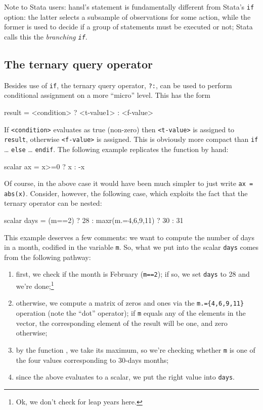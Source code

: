 Note to Stata users: hansl's  statement is fundamentally
different from Stata's \texttt{if} option: the latter selects a
subsample of observations for some action, while the former is used to
decide if a group of statements must be executed or not; Stata calls
this the \emph{branching \texttt{if}}.

\subsection{The ternary query operator}

Besides use of \texttt{if}, the ternary query operator, \texttt{?:},
can be used to perform conditional assignment on a more ``micro''
level. This has the form
\begin{code}
result = <condition> ? <t-value1> : <f-value>
\end{code}
If \texttt{<condition>} evaluates as true (non-zero) then
\texttt{<t-value>} is assigned to \texttt{result}, otherwise
\texttt{<f-value>} is assigned. This is obviously more compact than
\texttt{if} \dots{} \texttt{else} \dots{} \texttt{endif}. The
following example replicates the  function by hand:
\begin{code}
scalar ax = x>=0 ? x : -x
\end{code}
Of course, in the above case it would have been much simpler to just
write \texttt{ax = abs(x)}. Consider, however, the following case,
which exploits the fact that the ternary operator can be nested:
\begin{code}
scalar days = (m==2) ? 28 : maxr(m.={4,6,9,11}) ? 30 : 31
\end{code}
This example deserves a few comments: we want to compute the number of
days in a month, codified in the variable \texttt{m}. So, what we put into
the scalar \texttt{days} comes from the following pathway:
\begin{enumerate}
\item first, we check if the month is February (\texttt{m==2}); if so,
  we set \texttt{days} to 28 and we're done;\footnote{Ok, we don't
    check for leap years here.}
\item otherwise, we compute a matrix of zeros and ones via the
  \verb|m.={4,6,9,11}| operation (note the ``dot'' operator); if
  \texttt{m} equals any of the elements in the vector, the
  corresponding element of the result will be one, and zero otherwise;
\item by the function , we take its maximum, so we're
  checking whether \texttt{m} is one of the four values corresponding
  to 30-days months;
\item since the above evaluates to a scalar, we put the right value
  into \texttt{days}.
\end{enumerate}

